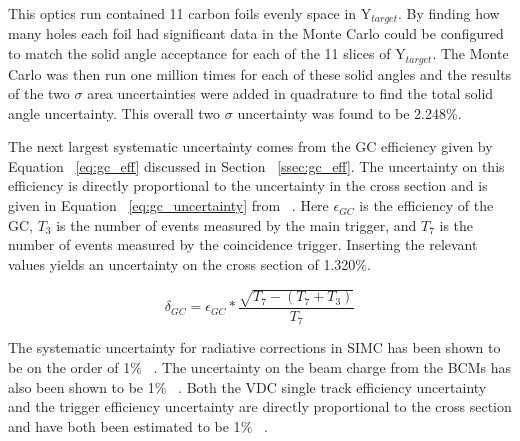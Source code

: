 This optics run contained 11 carbon foils evenly space in Y$_{target}$. By finding how many holes each foil had significant data in the Monte Carlo could be configured to match the solid angle acceptance for each of the 11 slices of Y$_{target}$. The Monte Carlo was then run one million times for each of these solid angles and the results of the two $\sigma$ area uncertainties were added in quadrature to find the total solid angle uncertainty. This overall two $\sigma$ uncertainty was found to be 2.248$\%$.

The next largest systematic uncertainty comes from the GC efficiency given by Equation ~\ref{eq:gc_eff} discussed in Section ~\ref{ssec:gc_eff}. The uncertainty on this efficiency is directly proportional to the uncertainty in the cross section and is given in Equation ~\ref{eq:gc_uncertainty} from ~\cite{dien_gc}. Here $\epsilon_{GC}$ is the efficiency of the GC, $T_3$ is the number of events measured by the main trigger, and $T_7$ is the number of events measured by the coincidence trigger. Inserting the relevant values yields an uncertainty on the cross section of 1.320$\%$.

\begin{equation} \label{eq:gc_uncertainty}
	\delta_{GC} = \epsilon_{GC} * \frac{\sqrt{T_7-(T_7+T_3)}}{T_7}
\end{equation}

The systematic uncertainty for radiative corrections in SIMC has been shown to be on the order of 1$\%$ ~\cite{Thesis:Wang}. The uncertainty on the beam charge from the BCMs has also been shown to be 1$\%$ ~\cite{Thesis:Wang}. Both the VDC single track efficiency uncertainty and the trigger efficiency uncertainty are directly proportional to the cross section and have both been estimated to be 1$\%$ ~\cite{Thesis:Ye}.

